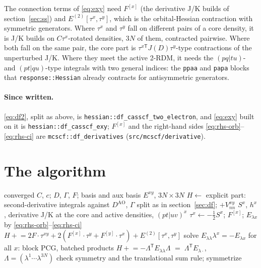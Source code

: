 \documentclass[11pt]{article}
\newcommand{\code}[1]{\texttt{#1}}
\newcommand{\Exy}{E^{xy}}
\begin{document}
The connection terms of \eqref{eq:exy} need $F^{[x]}$ (the derivative J/K
builds of section~\ref{sec:ss}) and $E^{(2)}[\tau^x,\tau^y]$, which is the
orbital-Hessian contraction with symmetric generators. Where $\tau^x$ and
$\tau^y$ fall on different pairs of a core density, it is J/K builds on
$C\tau^x$-rotated densities, $3N$ of them, contracted pairwise. Where both
fall on the same pair, the core part is $\tau^{x\mathsf T}J(D)\tau^y$-type
contractions of the unperturbed J/K. Where they meet the active 2-RDM, it
needs the $(pq|tu)$- and $(pt|qu)$-type integrals with two general
indices: the \code{ppaa} and \code{papa} blocks that \code{response::Hessian}
already contracts for antisymmetric generators.

\paragraph{Since written.} \eqref{eq:df2}, split as above, is
\code{hessian::df\_casscf\_two\_electron}, and \eqref{eq:exy} built on it
is \code{hessian::df\_casscf\_exy}; $F^{[x]}$ and the right-hand sides
\eqref{eq:rhs-orb}--\eqref{eq:rhs-ci} are \code{mcscf::df\_derivatives}
(\code{src/mcscf/derivative}).

\section{The algorithm}
\label{sec:algorithm}

\begin{algorithm}[ht]
\caption{State-specific CASSCF analytic Hessian, Eq.~\eqref{eq:ss}}
\label{alg:ss}
\begin{algorithmic}[1]
\Require converged $C$, $c$; $D$, $\Gamma$, $F$; basis and aux basis
\Ensure $\Exy$, $3N\times3N$
\State $H \gets$ explicit part: second-derivative integrals against
       $D^{\mathrm{AO}}$, $\Gamma$ split as in section~\ref{sec:df};
       $+V_{nn}^{xy}$
  \State $S^x$, $h^x$, derivative J/K at the core and active densities,
         $(pt|uv)^x$ 
  \State $\tau^x \gets -\frac12 S^x$;\; $F^{[x]}$;\;
         $E_{\lambda x}$ by \eqref{eq:rhs-orb}--\eqref{eq:rhs-ci}
\EndFor
\State $H \mathrel{+}= 2F\cdot\tau^{xy} + 2(F^{[x]}\cdot\tau^y + F^{[y]}\cdot\tau^x)
       + E^{(2)}[\tau^x,\tau^y]$ 
\State solve $E_{\lambda\lambda}\lambda^x = -E_{\lambda x}$ for all $x$:
       block PCG, batched products 
\State $H \mathrel{+}= -\Lambda^{\mathsf T}E_{\lambda\lambda}\Lambda$
       \;$=\; \Lambda^{\mathsf T}E_{\lambda\cdot}$, \;$\Lambda = (\lambda^1\cdots\lambda^{3N})$
\State check symmetry and the translational sum rule; symmetrize
\end{algorithmic}
\end{algorithm}
\end{document}
